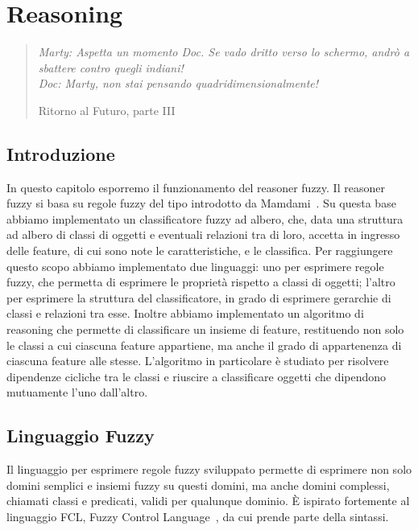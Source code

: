 \chapter{Reasoning}
\label{cap:reasoning}
\thispagestyle{empty}

\begin{quotation}
{\footnotesize
\noindent \emph{Marty: Aspetta un momento Doc. Se vado dritto verso lo schermo, andrò a sbattere contro quegli indiani! \\
Doc: Marty, non stai pensando quadridimensionalmente!}
\begin{flushright}
Ritorno al Futuro, parte III
\end{flushright}
}
\end{quotation}
\vspace{0.5cm}

\section{Introduzione}

In questo capitolo esporremo il funzionamento del reasoner fuzzy. Il reasoner fuzzy si basa su regole fuzzy del tipo introdotto da Mamdami~\cite{mamdani1975experiment}. 
Su questa base abbiamo implementato un classificatore fuzzy ad albero, che, data una struttura ad albero di classi di oggetti e eventuali relazioni tra di loro, accetta in ingresso delle feature, di cui sono note le caratteristiche, e le classifica.
Per raggiungere questo scopo abbiamo implementato due linguaggi: uno per esprimere regole fuzzy, che permetta di esprimere le proprietà rispetto a classi di oggetti; l'altro per esprimere la struttura del classificatore, in grado di esprimere gerarchie di classi e relazioni tra esse.
Inoltre abbiamo implementato un algoritmo di reasoning che permette di classificare un insieme di feature, restituendo non solo le classi a cui ciascuna feature appartiene, ma anche il grado di appartenenza di ciascuna feature alle stesse.
L'algoritmo in particolare è studiato per risolvere dipendenze cicliche tra le classi e riuscire a classificare oggetti che dipendono mutuamente l'uno dall'altro.

\section{Linguaggio Fuzzy}
Il linguaggio per esprimere regole fuzzy sviluppato permette di esprimere non solo domini semplici e insiemi fuzzy su questi domini, ma anche domini complessi, chiamati classi e predicati, validi per qualunque dominio. \`E ispirato fortemente al linguaggio FCL, Fuzzy Control Language~\cite{FCL}, da cui prende parte della sintassi.

